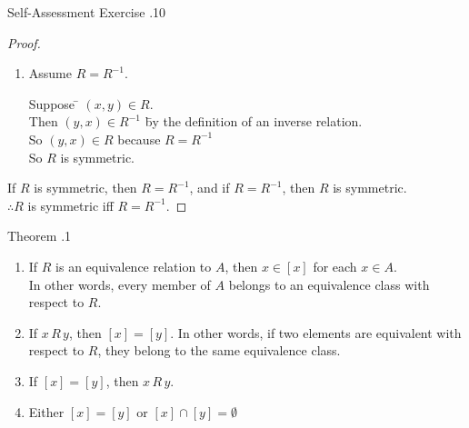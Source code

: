 \documentclass[\main/notes.tex]{subfiles}
\begin{document}
\begin{exercise}{Self-Assessment Exercise \thechapter.10}
\begin{enumerate}
\begin{proof}
\begin{enumerate}[label=(\roman*)]
									\item {}
										\begin{subproof}
											Assume $R = R^{-1}$.
											\begin{tabbing}
												Suppose \quad \= $(x, y) \in R$.\\
												Then \>$(y, x) \in R^{-1}$ \quad \= by the definition of an inverse relation.\\
												So \>$(y, x) \in R$ \> because $R = R^{-1}$\\
												So \> $R$ is symmetric.
											\end{tabbing}
										\end{subproof}
								\end{enumerate}
								If $R$ is symmetric, then $R = R^{-1}$, and if $R = R^{-1}$, then $R$ is symmetric.\\
								$\therefore R$ is symmetric iff $R = R^{-1}$.
							\end{proof}
					\end{enumerate}
				\end{exercise}
				\pagebreak
				\begin{theorem}{Theorem \thechapter.1}
					\begin{enumerate}[label=(\roman*)]
						\item If $R$ is an equivalence relation to $A$, then $x \in [x]$ for each $x \in A$.\\
							In other words, every member of $A$ belongs to an equivalence class with respect to $R$.
						\item If $x\, R \, y$, then $[x] = [y]$. In other words, if two elements are equivalent with respect to $R$, they belong to the same equivalence class.
						\item If $[x] = [y]$, then $x \, R \, y$.
						\item Either $[x] = [y]$ or $[x] \cap [y] = \emptyset$
					\end{enumerate}
				\end{theorem}
\end{document}
